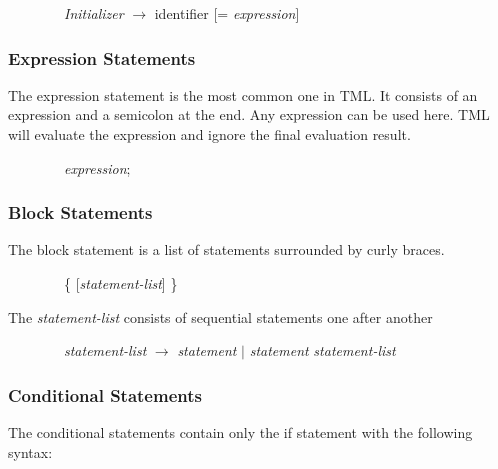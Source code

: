\documentclass[12pt,psfig,a4]{article}
\begin{document}
\begin{code}
\begin{tabbing}
~~~~~~~~\textsl{Initializer} $\rightarrow$ identifier [= \textsl{expression}]
\end{tabbing}
\end{code}

\subsubsection{Expression Statements}
The expression statement is the most common one in TML. It consists of an expression and a semicolon at the end. Any expression can be used here. TML will evaluate the expression and ignore the final evaluation result.

\begin{code}
\begin{tabbing}
~~~~~~~~\textsl{expression};
\end{tabbing}
\end{code}

\subsubsection{Block Statements}
The block statement is a list of statements surrounded by curly braces.

\begin{code}
\begin{tabbing}
~~~~~~~~\{ [\textsl{statement-list}]
\}
\end{tabbing}
\end{code}

The \textsl{statement-list} consists of sequential statements one after another

\begin{code}
\begin{tabbing}
~~~~~~~~\textsl{statement-list}  $\rightarrow$ \textsl{statement} $\mid$ \textsl{statement} \textsl{statement-list}
\end{tabbing}
\end{code}

\subsubsection{Conditional Statements}
The conditional statements contain only the if statement with the following syntax:
\end{document}
